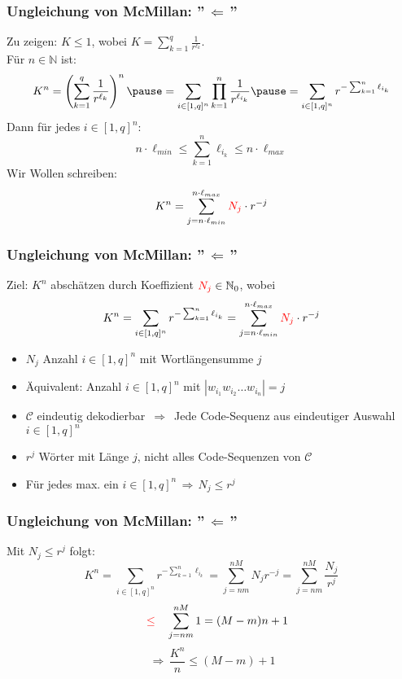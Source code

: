 \documentclass{beamer}
\begin{document}
\begin{frame}[t]
    \frametitle{Ungleichung von McMillan: ''$\,\Longleftarrow\,$''}
        Zu zeigen: $K \leq 1$, wobei
        $\displaystyle
            K = \sum_{k=1}^{q} \frac{1}{r^{\ell_k}}
        $.\\
        \pause
        Für $n \in \mathbb{N}$ ist:
        $$
            K^n = \left(\sum_{k=1}^{q} \frac{1}{r^{\ell_k}}\right)^n
            \pause
            = \sum_{i \in [1,q]^n} \prod_{k=1}^{n} \frac{1}{r^{\ell_{i_k}}}
            \pause
            = \sum_{i\in [1,q]^n} r^{-\sum_{k=1}^{n} \ell_{i_k}}
        $$\pause
        Dann für jedes $i \in [1,q]^n:$
        $$
            n\cdot \ell_{min} \leq \sum_{k=1}^{n} \ell_{i_k} \leq n\cdot \ell_{max}
        $$
        \pause
        Wir Wollen schreiben:
        $$
            K^n = \sum_{j=n\cdot \ell_{min}}^{n\cdot \ell_{max}} {\color{red}N_j}\cdot r^{-j}
        $$
\end{frame}

\begin{frame}[t]
    \frametitle{Ungleichung von McMillan: ''$\,\Longleftarrow\,$''}
    Ziel: $K^n$ abschätzen durch Koeffizient ${\color{red}N_j} \in \mathbb{N}_0$, wobei
    $$
        K^n = \sum_{i\in [1,q]^n} r^{-\sum_{k=1}^{n} \ell_{i_k}}
        = \sum_{j=n\cdot\ell_{min}}^{n\cdot\ell_{max}} {\color{red}N_j} \cdot r^{-j}
    $$
    \pause

    \begin{itemize}
        \setlength\itemsep{1em}
        \item $N_j$ Anzahl $i \in [1,q]^n$ mit Wortlängensumme $j$
        \pause
        \item Äquivalent: Anzahl $i \in [1,q]^n$ mit $|w_{i_1}w_{i_2}\dots w_{i_n}| = j$
        \pause
        \item $\mathcal{C}$ eindeutig dekodierbar
            $\,\Longrightarrow\,$ Jede Code-Sequenz aus eindeutiger Auswahl
                $i \in [1,q]^n$
        \pause
    \item $r^j$ Wörter mit Länge $j$, nicht alles Code-Sequenzen von $\mathcal{C}$
    \item Für jedes max. ein $i \in [1,q]^n \,\Longrightarrow\, N_j \leq r^j$
    \end{itemize}

\end{frame}

\begin{frame}[t]
    \frametitle{Ungleichung von McMillan: ''$\,\Longleftarrow\,$''}
        Mit {$N_j \leq r^j$} folgt:
        $$
            K^n =
            \sum_{i\in [1,q]^n} r^{-\sum_{k=1}^{n} \ell_{i_k}}
            = \sum_{j = nm}^{nM} N_jr^{-j}
            = \sum_{j = nm}^{nM} \frac{N_j}{r^j}
        $$
        \pause
        $$
            \quad{\color{red}\leq}\quad \sum_{j = nm}^{nM} 1
            = (M-m)n + 1
        $$
        \pause
        $$
            \,\Longrightarrow\, \frac{K^n}{n} \leq (M-m) + 1
        $$
\end{frame}
\end{document}
